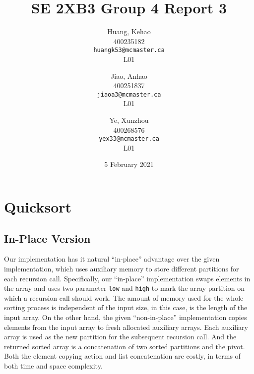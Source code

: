 \documentclass[titlepage, 12pt]{article}
\title{SE 2XB3 Group 4 Report 3}
\author{
  Huang, Kehao \\
  400235182 \\
  \texttt{huangk53@mcmaster.ca} \\
  L01
  \and
  Jiao, Anhao \\
  400251837 \\
  \texttt{jiaoa3@mcmaster.ca} \\
  L01
  \and
  Ye, Xunzhou \\
  400268576 \\
  \texttt{yex33@mcmaster.ca} \\
  L01
}
\date{5 February 2021}
\begin{document}
\maketitle{}

\newpage{}

\section{Quicksort}

\subsection{In-Place Version}

Our implementation has it natural ``in-place'' advantage over the given
implementation, which uses auxiliary memory to store different partitions for
each recursion call. Specifically, our ``in-place'' implementation swaps
elements in the array and uses two parameter \texttt{low} and \texttt{high} to
mark the array partition on which a recursion call should work. The amount of
memory used for the whole sorting process is independent of the input size, in
this case, is the length of the input array. On the other hand, the given
``non-in-place'' implementation copies elements from the input array to fresh
allocated auxiliary arrays. Each auxiliary array is used as the new partition
for the subsequent recursion call. And the returned sorted array is a
concatenation of two sorted partitions and the pivot. Both the element copying
action and list concatenation are costly, in terms of both time and space
complexity.
\end{document}
